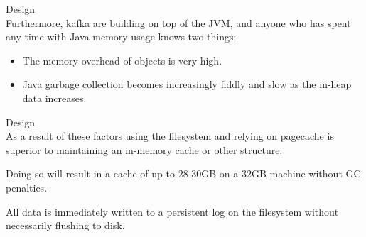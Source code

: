 \begin{frame}[plain,t]{Design} %
     \\
    \vspace{2ex}
    Furthermore, kafka are building on top of the JVM, and anyone who has spent any time with Java memory usage knows two things:
    \vspace{2ex}
    \begin{itemize}
        \item The memory overhead of objects is very high.
        \item  Java garbage collection becomes increasingly fiddly and slow as the in-heap data increases.
    \end{itemize}
    
    
   
    
    
\end{frame}
\begin{frame}[plain,t]{Design} %
     \\
    \vspace{2ex}
    As a result of these factors using the filesystem and relying on pagecache is superior to maintaining an in-memory cache or other structure.
    
    \vspace{2ex}
    Doing so will result in a cache of up to 28-30GB on a 32GB machine without GC penalties.
    
    \vspace{2ex}
    All data is immediately written to a persistent log on the filesystem without necessarily flushing to disk.
    
    
    \vspace{2ex}
    
    \vspace{2ex}
    
\end{frame}

